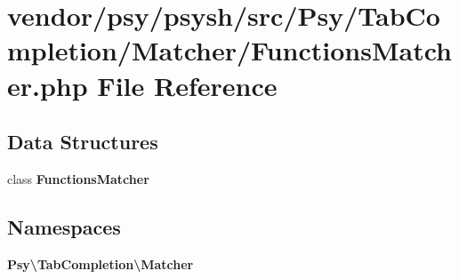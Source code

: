 \section{vendor/psy/psysh/src/\+Psy/\+Tab\+Completion/\+Matcher/\+Functions\+Matcher.php File Reference}
\label{_functions_matcher_8php}
\subsection*{Data Structures}
\begin{DoxyCompactItemize}
\item 
class {\bf Functions\+Matcher}
\end{DoxyCompactItemize}
\subsection*{Namespaces}
\begin{DoxyCompactItemize}
\item 
 {\bf Psy\textbackslash{}\+Tab\+Completion\textbackslash{}\+Matcher}
\end{DoxyCompactItemize}
